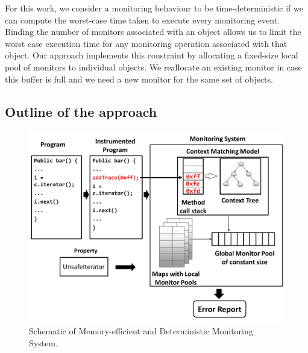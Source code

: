 For this work, we consider a monitoring behaviour to be time-deterministic if we can compute the 
worst-case time taken to execute every monitoring event. Binding the number of 
monitors associated with an object allows us to limit the worst case execution 
time for any monitoring operation associated with that object. Our approach 
implements this constraint by allocating a fixed-size local pool of monitors to 
individual objects. We reallocate an existing monitor in case this buffer is full and we need a new
monitor for the same set of objects.


\subsection{Outline of the approach}
\label{subsec:outline}

\begin{figure}[t]
\centering
  \includegraphics[scale=0.33, trim= 0 0 0 0]{./images/schematic.pdf}
  \caption[Schematic of Memory-efficient and Deterministic Monitoring 
System]{Schematic of Memory-efficient and Deterministic Monitoring System.}
  \label{fig:schematic}
\end{figure}

